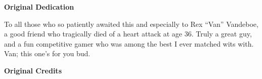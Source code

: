 
\thispagestyle{empty}



\begin{center}
\textbf{\Large Original Dedication}
\end{center}

To all those who so patiently awaited this and especially to Rex “Van” Vandeboe, a good friend who tragically died of a heart attack at age 36. Truly a great guy, and a fun competitive gamer who was among the best I ever matched wits with. Van; this one’s for you bud.

\begin{center}
\textbf{\Large Original Credits}
\end{center}

